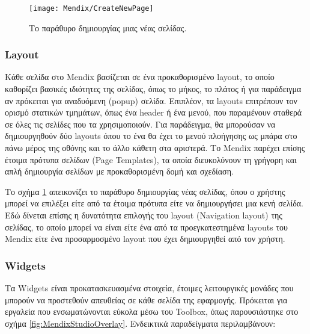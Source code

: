                 \begin{figure}[h!] \noindent \centering
                    \texttt{[image: Mendix/CreateNewPage]}
                    \caption{\centering Το παράθυρο δημιουργίας μιας νέας σελίδας.}
                    \label{fig:MendixCreateNewPage}
                \end{figure}

            \subsubsection{Layout}
            Κάθε σελίδα στο Mendix βασίζεται σε ένα προκαθορισμένο layout, το οποίο καθορίζει βασικές ιδιότητες της σελίδας, όπως το μήκος, το πλάτος ή για παράδειγμα αν πρόκειται για αναδυόμενη (popup) σελίδα. Επιπλέον, τα layouts επιτρέπουν τον ορισμό στατικών τμημάτων, όπως ένα header ή ένα μενού, που παραμένουν σταθερά σε όλες τις σελίδες που τα χρησιμοποιούν. Για παράδειγμα, θα μπορούσαν να δημιουργηθούν δύο layouts όπου το ένα θα έχει το μενού πλοήγησης ως μπάρα στο πάνω μέρος της οθόνης και το άλλο κάθετη στα αριστερά. Το Mendix παρέχει επίσης έτοιμα πρότυπα σελίδων (Page Templates), τα οποία διευκολύνουν τη γρήγορη και απλή δημιουργία σελίδων με προκαθορισμένη δομή και σχεδίαση.

            Το σχήμα \ref{fig:MendixCreateNewPage} απεικονίζει το παράθυρο δημιουργίας νέας σελίδας, όπου ο χρήστης μπορεί να επιλέξει είτε από τα έτοιμα πρότυπα είτε να δημιουργήσει μια κενή σελίδα. Εδώ δίνεται επίσης η δυνατότητα επιλογής του layout (Navigation layout) της σελίδας, το οποίο μπορεί να είναι είτε ένα από τα προεγκατεστημένα layouts του Mendix είτε ένα προσαρμοσμένο layout που έχει δημιουργηθεί από τον χρήστη.

            \subsubsection{Widgets}
                Τα Widgets είναι προκατασκευασμένα στοιχεία, έτοιμες λειτουργικές μονάδες που μπορούν να προστεθούν απευθείας σε κάθε σελίδα της εφαρμογής. Πρόκειται για εργαλεία που ενσωματώνονται εύκολα μέσω του Toolbox, όπως παρουσιάστηκε στο σχήμα \ref{fig:MendixStudioOverlay}. Ενδεικτικά παραδείγματα περιλαμβάνουν:

